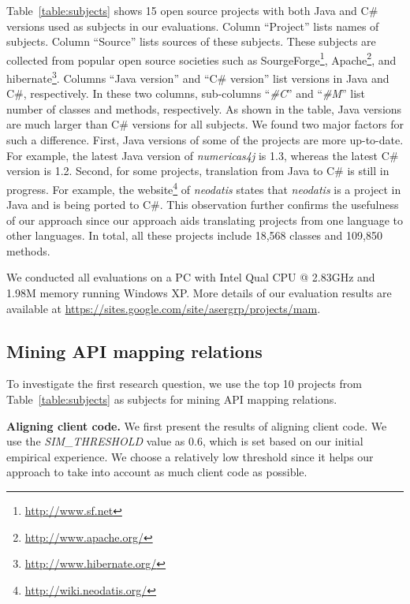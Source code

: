 Table~\ref{table:subjects} shows 15 open source projects with both Java and
C\# versions used as subjects in our evaluations.
Column ``Project'' lists names of subjects. Column ``Source'' lists sources of these
subjects. These subjects are collected from popular open source societies such
as SourgeForge\footnote{\url{http://www.sf.net}},
Apache\footnote{\url{http://www.apache.org/}}, and
hibernate\footnote{\url{http://www.hibernate.org/}}. Columns ``Java
version'' and ``C\# version'' list versions in Java and
C\#, respectively. In these two columns, sub-columns
``\emph{\#C}'' and ``\emph{\#M}'' list number of classes and methods, respectively. As shown
in the table, Java versions are much larger than C\# versions
for all subjects. We found two major factors for such
a difference. First, Java versions of some of the
projects are more up-to-date. For example, the latest Java
version of \emph{numericas4j} is 1.3, whereas the latest C\# version
is 1.2. Second, for some projects, translation from Java to C\# is still in
progress. For example, the
website\footnote{\url{http://wiki.neodatis.org/}} of \emph{neodatis}
states that \emph{neodatis} is a project in Java and is being ported
to C\#. This observation further confirms the usefulness of our
approach since our approach aids translating projects from one language to other
languages. In total, all these projects include 18,568 classes and 109,850
methods.

We conducted all evaluations on a PC with Intel Qual CPU @
2.83GHz and 1.98M memory running Windows XP. More details of our
evaluation results are available at \url{https://sites.google.com/site/asergrp/projects/mam}.

\subsection{Mining API mapping relations}
\label{sec:evaluation:mining}

To investigate the first research question, we use the top 10 projects
from Table~\ref{table:subjects} as subjects for mining API mapping relations.

\textbf{Aligning client code.}
We first present the results of aligning client code.
We use the \emph{SIM\_THRESHOLD} value as 0.6, which is set based on our initial
empirical experience. We choose a relatively low threshold since it helps our
approach to take into account as much client code as possible.

